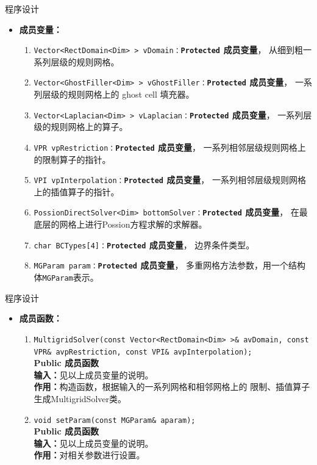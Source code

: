 \documentclass{beamer}
\begin{document}
  \begin{frame}{程序设计}
    \begin{itemize}
    \item \textbf{成员变量：}
      \begin{enumerate}[(1)]
        
      \item \texttt{Vector<RectDomain<Dim> > vDomain：}\textbf{\texttt{Protected}  成员变量}，
        从细到粗一系列层级的规则网格。
      \item \texttt{Vector<GhostFiller<Dim> > vGhostFiller：}\textbf{\texttt{Protected}  成员变量}，
        一系列层级的规则网格上的 ghost cell 填充器。
      \item \texttt{Vector<Laplacian<Dim> > vLaplacian：}\textbf{\texttt{Protected}  成员变量}，
        一系列层级的规则网格上的算子。
      \item \texttt{VPR vpRestriction：}\textbf{\texttt{Protected}  成员变量}，
        一系列相邻层级规则网格上的限制算子的指针。
      \item \texttt{VPI vpInterpolation：}\textbf{\texttt{Protected}  成员变量}，
          一系列相邻层级规则网格上的插值算子的指针。
        \item \texttt{PossionDirectSolver<Dim> bottomSolver：}\textbf{\texttt{Protected}  成员变量}，
          在最底层的网格上进行Possion方程求解的求解器。
        \item \texttt{char BCTypes[4]：}\textbf{\texttt{Protected}  成员变量}，
          边界条件类型。
        \item \texttt{MGParam param：}\textbf{\texttt{Protected}  成员变量}，
          多重网格方法参数，用一个结构体\texttt{MGParam}表示。
        \end{enumerate}
      \end{itemize}
    \end{frame}

\begin{frame}{程序设计}
  \begin{itemize}
      \item \textbf{成员函数：}
        \begin{enumerate}[(1)]
               \item \texttt{MultigridSolver(const Vector<RectDomain<Dim> >\& avDomain, const VPR\&
            avpRestriction, const VPI\& avpInterpolation);}\\
          \textbf{Public 成员函数}\\
          \textbf{输入：}见以上成员变量的说明。\\
          \textbf{作用：}构造函数，根据输入的一系列网格和相邻网格上的
          限制、插值算子生成MultigridSolver类。
          \item \texttt{void setParam(const MGParam\& aparam);}\\
          \textbf{Public 成员函数}\\
          \textbf{输入：}见以上成员变量的说明。\\
          \textbf{作用：}对相关参数进行设置。
        \end{enumerate}
      \end{itemize}
\end{frame}
\end{document}
